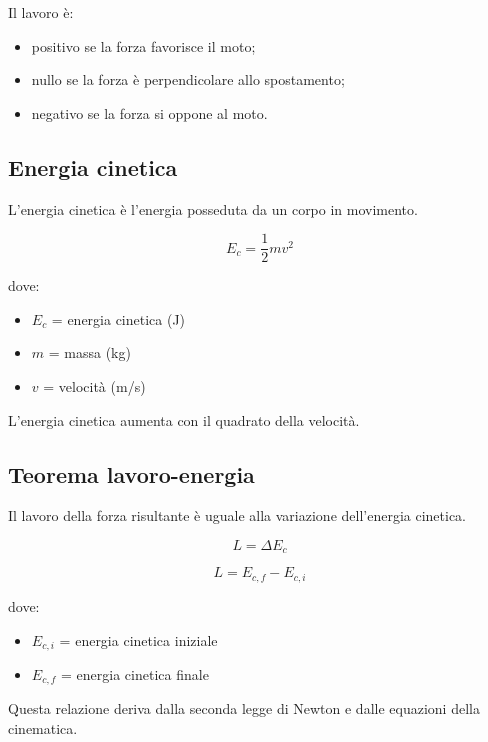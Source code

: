 \noindent
Il lavoro è:

\begin{itemize}
    \item positivo se la forza favorisce il moto;
    \item nullo se la forza è perpendicolare allo spostamento;
    \item negativo se la forza si oppone al moto.
\end{itemize}

\vspace{0.3cm}

\subsection{Energia cinetica}

\noindent
L'energia cinetica è l'energia posseduta da un corpo in movimento.

\[
\boxed{E_c=\frac12 mv^2}
\]

\noindent
dove:

\begin{itemize}
    \item $E_c$ = energia cinetica (J)
    \item $m$ = massa (kg)
    \item $v$ = velocità (m/s)
\end{itemize}

\noindent
L'energia cinetica aumenta con il quadrato della velocità.

\vspace{0.3cm}

\subsection{Teorema lavoro-energia}

\noindent
Il lavoro della forza risultante è uguale alla variazione dell'energia cinetica.

\[
\boxed{L=\Delta E_c}
\]

\[
\boxed{L=E_{c,f}-E_{c,i}}
\]

\noindent
dove:

\begin{itemize}
    \item $E_{c,i}$ = energia cinetica iniziale
    \item $E_{c,f}$ = energia cinetica finale
\end{itemize}

\noindent
Questa relazione deriva dalla seconda legge di Newton e dalle equazioni della cinematica.

